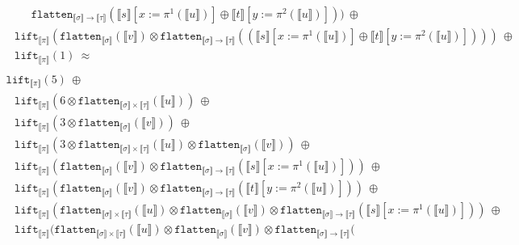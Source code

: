 \documentclass[a4paper,UKenglish,cleveref,autoref,numberwithinsect]{lipics-v2019}
\theoremstyle{definition}
\newcommand{\arrtype}{\rightarrow}
\newcommand{\flatten}{\mathtt{flatten}}
\newcommand{\lift}{\mathtt{lift}}
\newcommand{\typeinterpret}[1]{\llbracket #1 \rrbracket}
\newcommand{\interpret}[1]{\llbracket #1 \rrbracket}
\begin{document}
\begin{itemize}
\[\begin{array}{l}
  \phantom{ABC}
    \flatten_{\typeinterpret{\sigma} \arrtype \typeinterpret{\tau}}(
    \interpret{s}[x:=\pi^1(\interpret{u})] \oplus
    \interpret{t}[y:=\pi^2(\interpret{u})]))\ \oplus \\
  \phantom{A}
  \lift_{\typeinterpret{\pi}}(
    \flatten_{\typeinterpret{\sigma}}(\interpret{v}) \otimes
    \flatten_{\typeinterpret{\sigma} \arrtype \typeinterpret{\tau}}(
    (\interpret{s}[x:=\pi^1(\interpret{u})] \oplus
    \interpret{t}[y:=\pi^2(\interpret{u})])))\ \oplus \\
  \phantom{A}
  \lift_{\typeinterpret{\pi}}(1)\ \approx \\
  \end{array}
  \]
  \[
  \begin{array}{l}
  \lift_{\typeinterpret{\pi}}(5)\ \oplus \\
  \phantom{A}
  \lift_{\typeinterpret{\pi}}(6 \otimes
    \flatten_{\typeinterpret{\sigma} \times \typeinterpret{\tau}}(
    \interpret{u}))\ \oplus \\
  \phantom{A}
  \lift_{\typeinterpret{\pi}}(3 \otimes \flatten_{\typeinterpret{
    \sigma}}(\interpret{v}))\ \oplus \\
  \phantom{A}
  \lift_{\typeinterpret{\pi}}(3 \otimes \flatten_{\typeinterpret{
    \sigma} \times \typeinterpret{\tau}}(\interpret{u}) \otimes
    \flatten_{\typeinterpret{\sigma}}(\interpret{v}))\ \oplus \\
  \phantom{A}
  \lift_{\typeinterpret{\pi}}(
    \flatten_{\typeinterpret{\sigma}}(\interpret{v}) \otimes
    \flatten_{\typeinterpret{\sigma} \arrtype \typeinterpret{\tau}}(
    \interpret{s}[x:=\pi^1(\interpret{u})]))\ \oplus \\
  \phantom{A}
  \lift_{\typeinterpret{\pi}}(
    \flatten_{\typeinterpret{\sigma}}(\interpret{v}) \otimes
    \flatten_{\typeinterpret{\sigma} \arrtype \typeinterpret{
    \tau}}(\interpret{t}[y:=\pi^2(\interpret{u})]))\ \oplus \\
  \phantom{A}
  \lift_{\typeinterpret{\pi}}(\flatten_{\typeinterpret{\sigma} \times
    \typeinterpret{\tau}}(\interpret{u}) \otimes
    \flatten_{\typeinterpret{\sigma}}(\interpret{v}) \otimes
    \flatten_{\typeinterpret{\sigma} \arrtype \typeinterpret{\tau}}(
    \interpret{s}[x:=\pi^1(\interpret{u})]))\ \oplus \\
  \phantom{A}
  \lift_{\typeinterpret{\pi}}(\flatten_{\typeinterpret{\sigma} \times
    \typeinterpret{\tau}}(\interpret{u}) \otimes
    \flatten_{\typeinterpret{\sigma}}(\interpret{v}) \otimes
    \flatten_{\typeinterpret{\sigma} \arrtype \typeinterpret{\tau}}(

\end{array}\]
\end{itemize}
\end{document}

